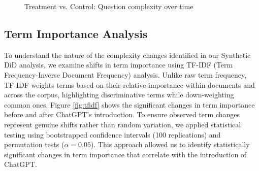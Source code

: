 \begin{figure}[htpb!]
    \centering
    
    \caption{Treatment vs. Control: Question complexity over time}
    \label{fig:complex}
\end{figure}


\subsection{Term Importance Analysis}
To understand the nature of the complexity changes identified in our Synthetic DiD analysis, we examine shifts in term importance using TF-IDF (Term Frequency-Inverse Document Frequency) analysis. Unlike raw term frequency, TF-IDF weights terms based on their relative importance within documents and across the corpus, highlighting discriminative terms while down-weighting common ones. Figure \ref{fig:tfidf} shows the significant changes in term importance before and after ChatGPT's introduction. To ensure observed term changes represent genuine shifts rather than random variation, we applied statistical testing using bootstrapped confidence intervals (100 replications) and permutation tests ($\alpha = 0.05$). This approach allowed us to identify statistically significant changes in term importance that correlate with the introduction of ChatGPT.
